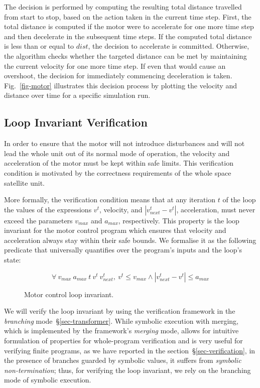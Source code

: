 The decision is performed by computing the resulting total distance
travelled from start to stop, based on the action taken in the current
time step.  First, the total distance is computed if the motor were to
accelerate for one more time step and then decelerate in the
subsequent time steps.  If the computed total distance is less than or
equal to $dist$, the decision to accelerate is committed.  Otherwise,
the algorithm checks whether the targeted distance can be met by
maintaining the current velocity for one more time step.  If even that
would cause an overshoot, the decision for immediately commencing
deceleration is taken. Fig.~\ref{fig-motor} illustrates this decision process by
plotting the velocity and distance over time for a specific simulation
run.

\subsection{Loop Invariant Verification}

In order to ensure that the motor will not introduce disturbances
and will not lead the whole unit out of its normal mode of operation, the velocity and
acceleration of the motor must be kept within safe limits. This verification condition
is motivated by the correctness requirements of the whole space satellite unit.

More formally, the verification condition means
that at any iteration $t$ of the loop the values of the
expressions $v^t$, velocity, and $\left| v^t_{next} - v^t \right|$,
acceleration, must never exceed the parameters $v_{max}$ and $a_{max}$, respectively.
This property is the loop invariant for the motor control program which
ensures that velocity and acceleration always stay within their safe bounds. We
formalise it as the following predicate that universally quantifies over the
program's inputs and the loop's state:

\vspace{1mm}
\begin{figure}[H]
\begin{tcolorbox}
\LARGE{
\[
  \forall\ v_{max}\ a_{max}\ t\ v^t\ v^t_{next},\ v^t \leq v_{max} \land \left| v^t_{next} - v^t \right| \leq a_{max}
\]}
\end{tcolorbox}
\caption{Motor control loop invariant.\label{fig-loop-invariant}}
\end{figure}

\noindent
We will verify the loop invariant by using the verification framework in the
\emph{branching} mode~\S\ref{sec-transformer}. While symbolic execution with
merging, which is implemented by the framework's \emph{merging} mode, allows
for intuitive formulation of properties for whole-program verification and
is very useful for verifying finite programs, as we have
reported in the section~\S\ref{sec-verification}, in the presence of branches
guarded by symbolic values, it suffers from \emph{symbolic non-termination};
thus, for verifying the loop invariant, we rely on the branching mode of
symbolic execution.

